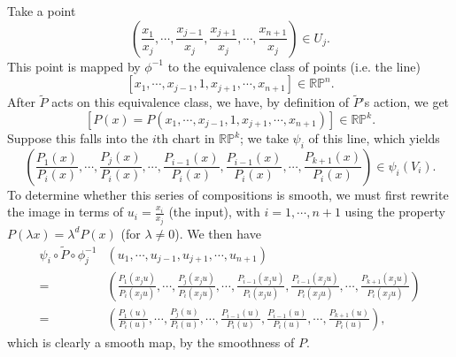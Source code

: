 \documentclass{mathnotes}
\begin{document}
\begin{figure}[h]
    \centering
\end{figure}
Take a point
\[\left( \frac{x_1}{x_j},\cdots,\frac{x_{j-1}}{x_j},\frac{x_{j+1}}{x_j},\cdots,\frac{x_{n+1}}{x_j}\right)\in U_j.\]
This point is mapped by $\phi^{-1}$
to the equivalence class of points (i.e. the line)
\[\left[x_1,\cdots,x_{j-1},1,x_{j+1},\cdots,x_{n+1}\right]\in\mathbb{R}\mathbb{P}^n.\]
After $\tilde{P}$ acts on this equivalence class, we have, by definition of $\tilde{P}$'s action, we get
\[\left[P(x)=P\left(x_1,\cdots,x_{j-1},1,x_{j+1},\cdots,
x_{n+1}\right)\right]\in\mathbb{R}\mathbb{P}^k.\]
Suppose this falls into the $i$th chart in $\mathbb{R}\mathbb{P}^k$; we take $\psi_i$ of this line, which yields
\[\left(\frac{P_1(x)}{P_i(x)},\cdots,\frac{P_j(x)}{P_i(x)},\cdots,\frac{P_{i-1}(x)}{P_i(x)},\frac{P_{i-1}(x)}{P_i(x)},\cdots,\frac{P_{k+1}(x)}{P_i(x)}\right)\in \psi_i(V_i).\]
To determine whether this series
of compositions is smooth, we must first rewrite the image in terms of $u_i=\frac{x_i}{x_j}$ (the input), with $i=1,\cdots, n+1$ using the property $P(\lambda x)=\lambda^dP(x)$ (for
$\lambda\neq 0$).
We then have
\begin{align*}
    \psi_i\circ\tilde{P}\circ\phi^{-1}_j&\left( u_1,\cdots,u_{j-1},u_{j+1},\cdots,u_{n+1} \right)\\
    =&\left(\frac{P_1(x_ju)}{P_i(x_ju)},\cdots,\frac{P_j(x_ju)}{P_i(x_ju)},\cdots,\frac{P_{i-1}(x_ju)}{P_i(x_ju)},\frac{P_{i-1}(x_ju)}{P_i(x_ju)},\cdots,\frac{P_{k+1}(x_ju)}{P_i(x_ju)}\right)\\
    =&\left(\frac{P_1(u)}{P_i(u)},\cdots,\frac{P_j(u)}{P_i(u)},\cdots,\frac{P_{i-1}(u)}{P_i(u)},\frac{P_{i-1}(u)}{P_i(u)},\cdots,\frac{P_{k+1}(u)}{P_i(u)}\right),
\end{align*}
which is clearly a smooth map, by the smoothness of $P$.
\end{document}
